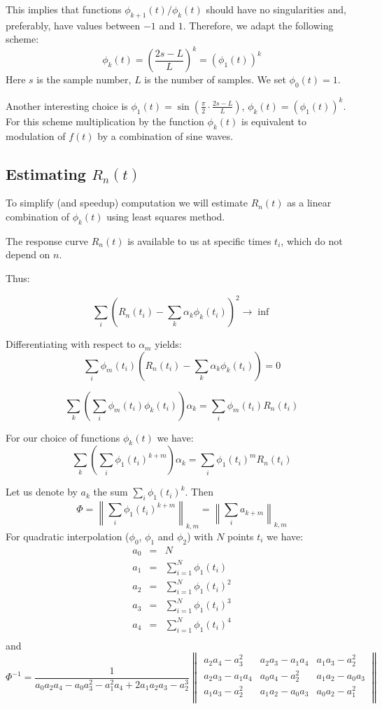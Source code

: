 \documentclass[12pt]{article}
\begin{document}
This implies that functions $\phi_{k+1}(t)/\phi_k(t)$ should have no singularities 
and, preferably, have values between $-1$ and $1$. Therefore, we adapt the following
scheme:
$$
\phi_k(t)=\left(\frac{2s-L}{L}\right)^k=\left(\phi_1(t)\right)^k
$$
Here $s$ is the sample number, $L$ is the number of samples. We set $\phi_0(t)=1$.

Another interesting choice is $\phi_1(t)=\sin\left(\frac{\pi}{2}\cdot\frac{2s-L}{L}\right)$,
$\phi_k(t)=\left(\phi_1(t)\right)^k$. For this scheme multiplication by the function $\phi_k(t)$
is equivalent to modulation of $f(t)$ by a combination of sine waves.

\subsection{Estimating $R_n(t)$}
To simplify (and speedup) computation we will estimate $R_n(t)$ as a linear
combination of $\phi_k(t)$ using least squares method.

The response curve $R_n(t)$ is available to us at specific times $t_i$, which
do not depend on $n$.

Thus:

$$
\sum_i \left(R_n(t_i)-\sum_k\alpha_k \phi_k(t_i)\right)^2\rightarrow \inf
$$

Differentiating with respect to $\alpha_{m}$ yields:
$$
\sum_i \phi_m(t_i)\left(R_n(t_i)-\sum_k\alpha_k \phi_k(t_i)\right)=0
$$

$$
\sum_k \left(\sum_i\phi_m(t_i)\phi_k(t_i)\right)\alpha_k =\sum_i\phi_m(t_i)R_n(t_i)
$$

For our choice of functions $\phi_k(t)$ we have:
$$
\sum_k \left(\sum_i\phi_1(t_i)^{k+m}\right)\alpha_k =\sum_i\phi_1(t_i)^m R_n(t_i)
$$

Let us denote by $a_k$ the sum $\sum_i \phi_1(t_i)^k$.
Then 
$$
\Phi=\left\|\sum_i\phi_1(t_i)^{k+m}\right\|_{k,m}=\left\|\sum_i a_{k+m}\right\|_{k,m}
$$
For quadratic interpolation ($\phi_0$, $\phi_1$ and $\phi_2$) with $N$ points $t_i$ we have:
$$
\begin{array}{rcl}
a_0&=&N\\
a_1&=&\sum_{i=1}^N \phi_1(t_i)\\
a_2&=&\sum_{i=1}^N \phi_1(t_i)^2\\
a_3&=&\sum_{i=1}^N \phi_1(t_i)^3\\
a_4&=&\sum_{i=1}^N \phi_1(t_i)^4\\
\end{array}
$$
and
$$
\Phi^{-1}=\frac{1}{a_0a_2a_4 -a_0a_3^2-a_1^2a_4+2a_1a_2a_3-a_2^3}
	\left\|
	\begin{array}{ccc}
	a_2a_4-a_3^2 & a_2a_3-a_1a_4 & a_1a_3-a_2^2\\
	 a_2a_3-a_1a_4 & a_0a_4-a_2^2  & a_1a_2-a_0a_3\\
	a_1a_3-a_2^2 & a_1a_2-a_0a_3 & a_0a_2 -a_1^2\\
	\end{array}
	\right\|
$$
\end{document}
